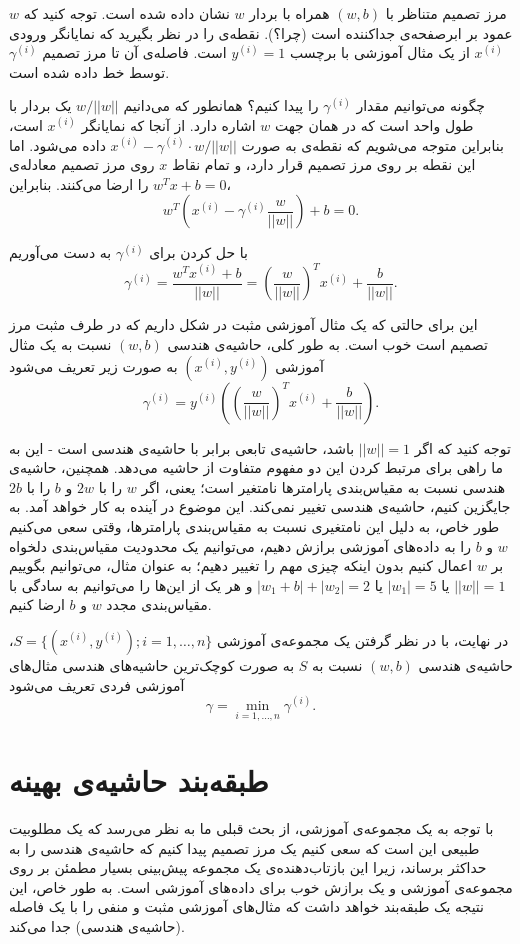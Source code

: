 \documentclass[12pt]{article}
\begin{document}
مرز تصمیم متناظر با
$(w, b)$
همراه با بردار
$w$
نشان داده شده است. توجه کنید که
$w$
عمود بر ابرصفحه‌ی جداکننده است (چرا؟). نقطه‌ی
را در نظر بگیرید که نمایانگر ورودی
$x^{(i)}$
از یک مثال آموزشی با برچسب
$y^{(i)} = 1$
است. فاصله‌ی آن تا مرز تصمیم
$\gamma^{(i)}$
توسط خط
داده شده است.

چگونه می‌توانیم مقدار
$\gamma^{(i)}$
را پیدا کنیم؟ همانطور که می‌دانیم
$w/||w||$
یک بردار با طول واحد است که در همان جهت
$w$
اشاره دارد. از آنجا که
نمایانگر
$x^{(i)}$
است، بنابراین متوجه می‌شویم که نقطه‌ی
به صورت
$x^{(i)} - \gamma^{(i)} \cdot w/||w||$
داده می‌شود. اما این نقطه بر روی مرز تصمیم قرار دارد، و تمام نقاط
$x$
روی مرز تصمیم معادله‌ی
$w^T x + b = 0$
را ارضا می‌کنند. بنابراین،
$$w^T \left( x^{(i)} - \gamma^{(i)} \frac{w}{||w||} \right) + b = 0.$$

با حل کردن برای
$\gamma^{(i)}$
به دست می‌آوریم
$$\gamma^{(i)} = \frac{w^T x^{(i)} + b}{||w||} = \left( \frac{w}{||w||} \right)^T x^{(i)} + \frac{b}{||w||}.$$

این برای حالتی که یک مثال آموزشی مثبت
در شکل داریم که در طرف مثبت مرز تصمیم است خوب است. به طور کلی، حاشیه‌ی هندسی
$(w, b)$
نسبت به یک مثال آموزشی
$(x^{(i)}, y^{(i)})$
به صورت زیر تعریف می‌شود
$$\gamma^{(i)} = y^{(i)} \left( \left( \frac{w}{||w||} \right)^T x^{(i)} + \frac{b}{||w||} \right).$$

توجه کنید که اگر
$||w|| = 1$
باشد، حاشیه‌ی تابعی برابر با حاشیه‌ی هندسی است - این به ما راهی برای مرتبط کردن این دو مفهوم متفاوت از حاشیه می‌دهد. همچنین، حاشیه‌ی هندسی نسبت به مقیاس‌بندی پارامترها نامتغیر است؛ یعنی، اگر
$w$
را با
$2w$
و
$b$
را با
$2b$
جایگزین کنیم، حاشیه‌ی هندسی تغییر نمی‌کند. این موضوع در آینده به کار خواهد آمد. به طور خاص، به دلیل این نامتغیری نسبت به مقیاس‌بندی پارامترها، وقتی سعی می‌کنیم
$w$
و
$b$
را به داده‌های آموزشی برازش دهیم، می‌توانیم یک محدودیت مقیاس‌بندی دلخواه بر
$w$
اعمال کنیم بدون اینکه چیزی مهم را تغییر دهیم؛ به عنوان مثال، می‌توانیم بگوییم
$||w|| = 1$
یا
$|w_1| = 5$
یا
$|w_1 + b| + |w_2| = 2$
و هر یک از این‌ها را می‌توانیم به سادگی با مقیاس‌بندی مجدد
$w$
و
$b$
ارضا کنیم.

در نهایت، با در نظر گرفتن یک مجموعه‌ی آموزشی
$S = \{(x^{(i)}, y^{(i)}); i = 1, \ldots, n\}$،
حاشیه‌ی هندسی
$(w, b)$
نسبت به
$S$
به صورت کوچک‌ترین حاشیه‌های هندسی مثال‌های آموزشی فردی تعریف می‌شود
$$\gamma = \min_{i=1, \ldots, n} \gamma^{(i)}.$$

\section{طبقه‌بند حاشیه‌ی بهینه}
با توجه به یک مجموعه‌ی آموزشی، از بحث قبلی ما به نظر می‌رسد که یک مطلوبیت طبیعی این است که سعی کنیم یک مرز تصمیم پیدا کنیم که حاشیه‌ی هندسی را به حداکثر برساند، زیرا این بازتاب‌دهنده‌ی یک مجموعه پیش‌بینی بسیار مطمئن بر روی مجموعه‌ی آموزشی و یک برازش خوب برای داده‌های آموزشی است. به طور خاص، این نتیجه یک طبقه‌بند خواهد داشت که مثال‌های آموزشی مثبت و منفی را با یک فاصله (حاشیه‌ی هندسی) جدا می‌کند.
\end{document}
